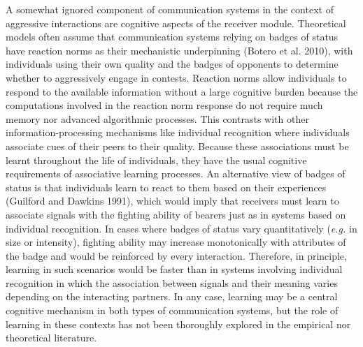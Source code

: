 \documentclass[
  12pt,
]{article}
\begin{document}
A somewhat ignored component of communication systems in the context of
aggressive interactions are cognitive aspects of the receiver module.
Theoretical models often assume that communication systems relying on
badges of status have reaction norms as their mechanistic underpinning
(Botero et al. 2010), with individuals using their own quality and the
badges of opponents to determine whether to aggressively engage in
contests. Reaction norms allow individuals to respond to the available
information without a large cognitive burden because the computations
involved in the reaction norm response do not require much memory nor
advanced algorithmic processes. This contrasts with other
information-processing mechanisms like individual recognition where
individuals associate cues of their peers to their quality. Because
these associations must be learnt throughout the life of individuals,
they have the usual cognitive requirements of associative learning
processes. An alternative view of badges of status is that individuals
learn to react to them based on their experiences (Guilford and Dawkins
1991), which would imply that receivers must learn to associate signals
with the fighting ability of bearers just as in systems based on
individual recognition. In cases where badges of status vary
quantitatively (\emph{e.g.} in size or intensity), fighting ability may
increase monotonically with attributes of the badge and would be
reinforced by every interaction. Therefore, in principle, learning in
such scenarios would be faster than in systems involving individual
recognition in which the association between signals and their meaning
varies depending on the interacting partners. In any case, learning may
be a central cognitive mechanism in both types of communication systems,
but the role of learning in these contexts has not been thoroughly
explored in the empirical nor theoretical literature.
\end{document}
